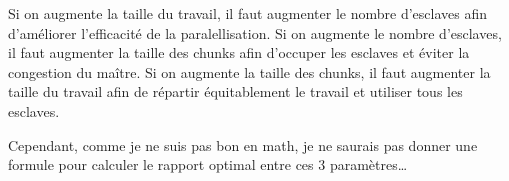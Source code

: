 \documentclass[oneside,10pt]{article}
\begin{document}
Si on augmente la taille du travail, il faut augmenter le nombre d'esclaves afin d'am\'eliorer l'efficacit\'e de la paralellisation.
Si on augmente le nombre d'esclaves, il faut augmenter la taille des chunks afin d'occuper les esclaves et \'eviter la congestion du ma\^itre.
Si on augmente la taille des chunks, il faut augmenter la taille du travail afin de r\'epartir \'equitablement le travail et utiliser tous les esclaves.


Cependant, comme je ne suis pas bon en math, je ne saurais pas donner une formule pour calculer le rapport optimal entre ces 3 param\`etres\ldots
\end{document}
